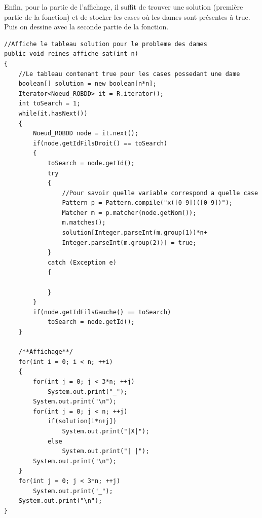 \documentclass{article}
\begin{document}
Enfin, pour la partie de l'affichage, il suffit de trouver une solution (première partie de la fonction) et de stocker les cases où les dames sont présentes à true. Puis on dessine avec la seconde partie de la fonction.
\begin{verbatim}
//Affiche le tableau solution pour le probleme des dames
public void reines_affiche_sat(int n)
{
	//Le tableau contenant true pour les cases possedant une dame
	boolean[] solution = new boolean[n*n];
	Iterator<Noeud_ROBDD> it = R.iterator();
	int toSearch = 1;
	while(it.hasNext())
	{
		Noeud_ROBDD node = it.next();
		if(node.getIdFilsDroit() == toSearch)
		{
			toSearch = node.getId();
			try
			{
				//Pour savoir quelle variable correspond a quelle case
				Pattern p = Pattern.compile("x([0-9])([0-9])");
				Matcher m = p.matcher(node.getNom());
				m.matches();
				solution[Integer.parseInt(m.group(1))*n+
				Integer.parseInt(m.group(2))] = true;
			}
			catch (Exception e)
			{
			
			}
		}
		if(node.getIdFilsGauche() == toSearch)
			toSearch = node.getId();
	}
	
	/**Affichage**/
	for(int i = 0; i < n; ++i)
	{
		for(int j = 0; j < 3*n; ++j)
			System.out.print("_");
		System.out.print("\n");
		for(int j = 0; j < n; ++j)
			if(solution[i*n+j])
				System.out.print("|X|");
			else
				System.out.print("| |");
		System.out.print("\n");
	}
	for(int j = 0; j < 3*n; ++j)
		System.out.print("_");
	System.out.print("\n");
}
\end{verbatim}
\end{document}
